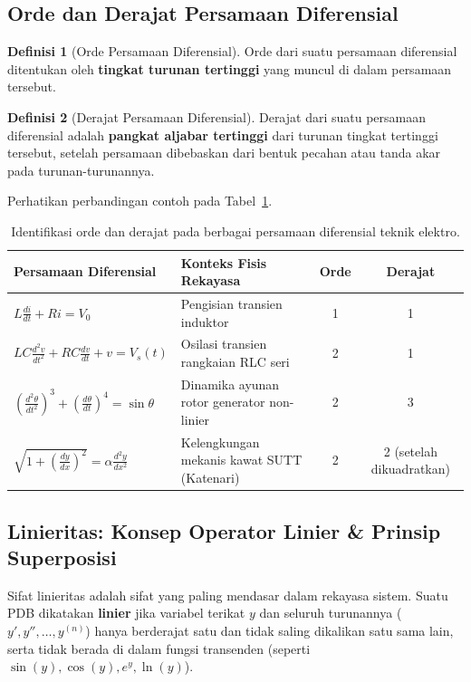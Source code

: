 \documentclass[11pt,a4paper]{article}
\theoremstyle{definition}
\newtheorem{definition}{Definisi}[section]
\begin{document}
\subsection{Orde dan Derajat Persamaan Diferensial}

\begin{definition}[Orde Persamaan Diferensial]
Orde dari suatu persamaan diferensial ditentukan oleh \textbf{tingkat turunan tertinggi} yang muncul di dalam persamaan tersebut.
\end{definition}

\begin{definition}[Derajat Persamaan Diferensial]
Derajat dari suatu persamaan diferensial adalah \textbf{pangkat aljabar tertinggi} dari turunan tingkat tertinggi tersebut, setelah persamaan dibebaskan dari bentuk pecahan atau tanda akar pada turunan-turunannya.
\end{definition}

Perhatikan perbandingan contoh pada Tabel~\ref{tab:orde_derajat}.

\begin{table}[htbp]
\centering
\caption{Identifikasi orde dan derajat pada berbagai persamaan diferensial teknik elektro.}
\label{tab:orde_derajat}
\begin{tabularx}{\textwidth}{lXcc}
\toprule
\textbf{Persamaan Diferensial} & \textbf{Konteks Fisis Rekayasa} & \textbf{Orde} & \textbf{Derajat} \\ \midrule
$L \frac{di}{dt} + R i = V_0$ & Pengisian transien induktor & 1 & 1 \\
$L C \frac{d^2v}{dt^2} + R C \frac{dv}{dt} + v = V_s(t)$ & Osilasi transien rangkaian RLC seri & 2 & 1 \\
$\left(\frac{d^2\theta}{dt^2}\right)^3 + \left(\frac{d\theta}{dt}\right)^4 = \sin\theta$ & Dinamika ayunan rotor generator non-linier & 2 & 3 \\
$\sqrt{1 + \left(\frac{dy}{dx}\right)^2} = \alpha \frac{d^2y}{dx^2}$ & Kelengkungan mekanis kawat SUTT (Katenari) & 2 & 2 (setelah dikuadratkan) \\ \bottomrule
\end{tabularx}
\end{table}

\subsection{Linieritas: Konsep Operator Linier \& Prinsip Superposisi}

Sifat linieritas adalah sifat yang paling mendasar dalam rekayasa sistem. Suatu PDB dikatakan \textbf{linier} jika variabel terikat $y$ dan seluruh turunannya ($y', y'', \dots, y^{(n)}$) hanya berderajat satu dan tidak saling dikalikan satu sama lain, serta tidak berada di dalam fungsi transenden (seperti $\sin(y), \cos(y), e^y, \ln(y)$).
\end{document}
